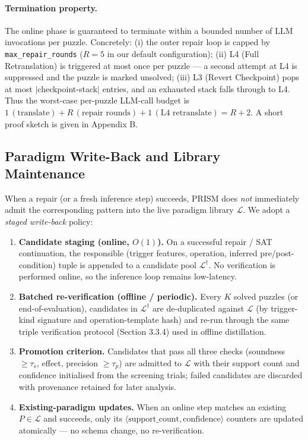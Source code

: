 \paragraph{Termination property.} The online phase is guaranteed to terminate within a bounded number of LLM invocations per puzzle. Concretely: (i) the outer repair loop is capped by \texttt{max\_repair\_rounds} ($R{=}5$ in our default configuration); (ii) L4 (Full Retranslation) is triggered at most once per puzzle — a second attempt at L4 is suppressed and the puzzle is marked unsolved; (iii) L3 (Revert Checkpoint) pops at most $|$checkpoint-stack$|$ entries, and an exhausted stack falls through to L4. Thus the worst-case per-puzzle LLM-call budget is $1\,(\text{translate}) + R\,(\text{repair rounds}) + 1\,(\text{L4 retranslate}) = R+2$. A short proof sketch is given in Appendix B.

\subsection{Paradigm Write-Back and Library Maintenance}
\label{sec:writeback}

When a repair (or a fresh inference step) succeeds, PRISM does \emph{not} immediately admit the corresponding pattern into the live paradigm library $\mathcal{L}$. We adopt a \emph{staged write-back} policy:

\begin{enumerate}
    \item \textbf{Candidate staging (online, $O(1)$).} On a successful repair / SAT continuation, the responsible (trigger features, operation, inferred pre/post-condition) tuple is appended to a candidate pool $\mathcal{L}^{\dagger}$. No verification is performed online, so the inference loop remains low-latency.
    \item \textbf{Batched re-verification (offline / periodic).} Every $K$ solved puzzles (or end-of-evaluation), candidates in $\mathcal{L}^{\dagger}$ are de-duplicated against $\mathcal{L}$ (by trigger-kind signature and operation-template hash) and re-run through the same triple verification protocol (Section 3.3.4) used in offline distillation.
    \item \textbf{Promotion criterion.} Candidates that pass all three checks (soundness $\geq \tau_s$, effect, precision $\geq \tau_p$) are admitted to $\mathcal{L}$ with their support count and confidence initialised from the screening trials; failed candidates are discarded with provenance retained for later analysis.
    \item \textbf{Existing-paradigm updates.} When an online step matches an existing $P \in \mathcal{L}$ and succeeds, only its $\langle\text{support\_count}, \text{confidence}\rangle$ counters are updated atomically — no schema change, no re-verification.
\end{enumerate}

